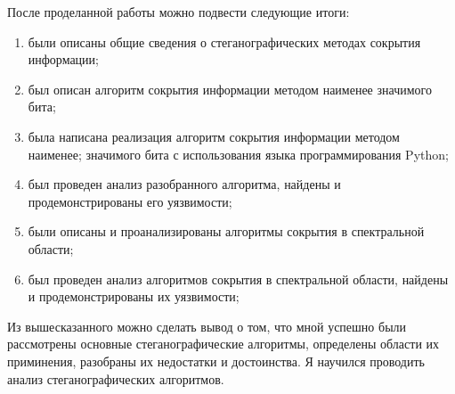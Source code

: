 \Conclusion
После проделанной работы можно подвести следующие итоги:
\begin{enumerate}
    \item были описаны общие сведения о стеганографических методах сокрытия информации;
    \item был описан алгоритм сокрытия информации методом наименее значимого бита;
    \item была написана реализация алгоритм сокрытия информации методом наименее;
    значимого бита с использования языка программирования Python;
    \item был проведен анализ разобранного алгоритма, найдены и продемонстрированы
    его уязвимости;
    \item были описаны и проанализированы алгоритмы сокрытия в спектральной области;
    \item был проведен анализ алгоритмов сокрытия в спектральной области,
    найдены и продемонстрированы их уязвимости;
\end{enumerate}

Из вышесказанного можно сделать вывод о том, что мной успешно были
рассмотрены основные стеганографические алгоритмы, определены области их приминения,
разобраны их недостатки и достоинства. Я научился проводить анализ стеганографических алгоритмов.